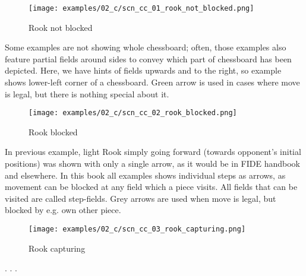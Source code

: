 \vspace*{-0.7\baselineskip}
\noindent
\begin{wrapfigure}[12]{l}{0.4\textwidth}
\centering
\texttt{[image: examples/02\_c/scn\_cc\_01\_rook\_not\_blocked.png]}
\vspace*{-1.4\baselineskip}
\caption{Rook not blocked}
\label{fig:scn_cc_01_rook_not_blocked}
\end{wrapfigure}
Some examples are not showing whole chessboard; often, those examples also
feature partial fields around sides to convey which part of chessboard has
been depicted. \newline
\indent
Here, we have hints of fields upwards and to the right, so example shows
lower-left corner of a chessboard. \newline
\indent
Green arrow is used in cases where move is legal, but there is nothing special
about it.

\vspace*{2.7\baselineskip}
\noindent
\begin{wrapfigure}[15]{l}{0.4\textwidth}
\centering
\texttt{[image: examples/02\_c/scn\_cc\_02\_rook\_blocked.png]}
\vspace*{-1.4\baselineskip}
\caption{Rook blocked}
\label{fig:scn_cc_02_rook_blocked}
\end{wrapfigure}
In previous example, light Rook simply going forward (towards opponent's initial
positions) was shown with only a single arrow, as it would be in FIDE handbook and
elsewhere. \newline
\indent
In this book all examples shows individual steps as arrows, as movement can be
blocked at any field which a piece visits. All fields that can be visited are
called step-fields. \newline
\indent
Grey arrows are used when move is legal, but blocked by e.g. own other piece.

\clearpage %

\vspace*{-1.4\baselineskip}
\noindent
\begin{wrapfigure}[1]{l}{0.4\textwidth}
\centering
\texttt{[image: examples/02\_c/scn\_cc\_03\_rook\_capturing.png]}
\vspace*{-1.4\baselineskip}
\caption{Rook capturing}
\label{fig:scn_cc_03_rook_capturing}
\end{wrapfigure}
. . .

